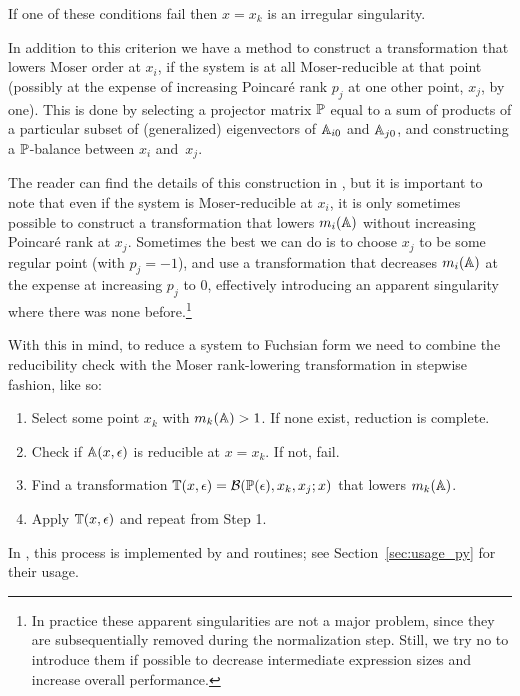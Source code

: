 \documentclass[12pt,a4paper]{article}
\begin{document}

If one of these conditions fail then $x=x_k$ is an irregular singularity.

In addition to this criterion we have a method to construct a transformation that lowers Moser order at $x_i$, if the system is at all Moser-reducible at that point (possibly at the expense of increasing Poincar\'e rank $p_j$ at one other point, $x_j$, by one).
This is done by selecting a projector matrix $\mathbb{P}$ equal to a sum of products of a particular subset of (generalized) eigenvectors of $\mathbb{A}_{i0}$ and $\mathbb{A}_{j0}$, and constructing a $\mathbb{P}$-balance between $x_i$ and~$x_j$.

The reader can find the details of this construction in \cite{Lee15}, but it is important to note that even if the system is Moser-reducible at $x_i$, it is only sometimes possible to construct a transformation that lowers $m_i(\mathbb{A})$ without increasing Poincar\'e rank at $x_j$.
Sometimes the best we can do is to choose $x_j$ to be some regular point (with $p_j=-1$), and use a transformation that decreases $m_i(\mathbb{A})$ at the expense at increasing $p_j$ to $0$, effectively introducing an apparent singularity where there was none before.\footnote{
    In practice these apparent singularities are not a major problem, since they are subsequentially removed during the normalization step.
    Still, we try no to introduce them if possible to decrease intermediate expression sizes and increase overall performance.
}

With this in mind, to reduce a system to Fuchsian form we need to combine the reducibility check with the Moser rank-lowering transformation in stepwise fashion, like so:

\begin{enumerate}
    \item Select some point $x_k$ with $m_k(\mathbb{A}) > 1$. If none exist, reduction is complete.
    \item Check if $\mathbb{A}(x,\epsilon)$ is reducible at $x=x_k$. If not, fail.
    \item Find a transformation $\mathbb{T}(x,\epsilon) = \mathcal{B}(\mathbb{P}(\epsilon), x_k, x_j; x)$ that lowers $m_k(\mathbb{A})$.
    \item Apply $\mathbb{T}(x,\epsilon)$ and repeat from Step 1.
\end{enumerate}

In \fuchsia, this process is implemented by  and  routines; see Section~\ref{sec:usage_py} for their usage.
\end{document}
